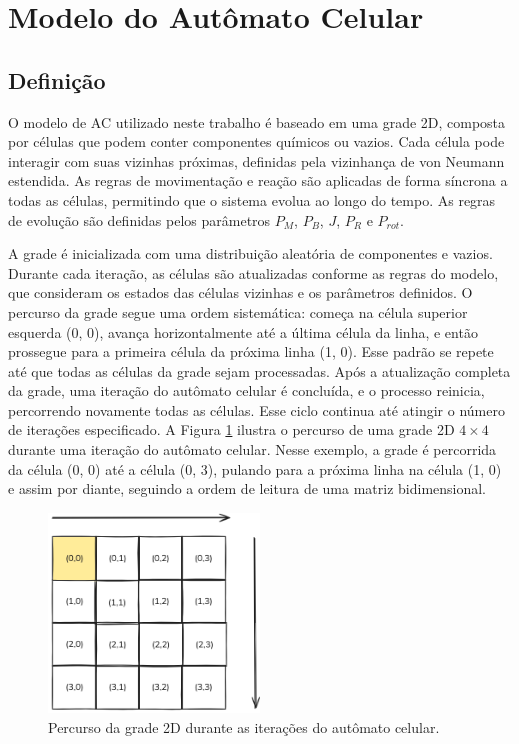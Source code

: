 \documentclass[12pt,oneside]{report}
\begin{document}
\section{Modelo do Autômato Celular}

\subsection{Definição}

O modelo de AC utilizado neste trabalho é baseado em uma grade 2D, composta por células que podem conter componentes químicos ou vazios. Cada célula pode interagir com suas vizinhas próximas, definidas pela vizinhança de von Neumann estendida. As regras de movimentação e reação são aplicadas de forma síncrona a todas as células, permitindo que o sistema evolua ao longo do tempo. As regras de evolução são definidas pelos parâmetros \hyperref[subsubsec:Pm]{$P_M$}, \hyperref[subsubsec:Pb]{$P_B$}, \hyperref[subsubsec:J]{$J$}, \hyperref[subsubsec:Pr]{$P_R$} e \hyperref[subsubsec:Prot]{$P_{rot}$}.

A grade é inicializada com uma distribuição aleatória de componentes e vazios. Durante cada iteração, as células são atualizadas conforme as regras do modelo, que consideram os estados das células vizinhas e os parâmetros definidos. O percurso da grade segue uma ordem sistemática: começa na célula superior esquerda (0, 0), avança horizontalmente até a última célula da linha, e então prossegue para a primeira célula da próxima linha (1, 0). Esse padrão se repete até que todas as células da grade sejam processadas. Após a atualização completa da grade, uma iteração do autômato celular é concluída, e o processo reinicia, percorrendo novamente todas as células. Esse ciclo continua até atingir o número de iterações especificado. A Figura \ref{fig:percorre_grade} ilustra o percurso de uma grade 2D $4 \times 4$ durante uma iteração do autômato celular. Nesse exemplo, a grade é percorrida da célula (0, 0) até a célula (0, 3), pulando para a próxima linha na célula (1, 0) e assim por diante, seguindo a ordem de leitura de uma matriz bidimensional.

\begin{figure}[H]
    \centering
    \includegraphics[width=0.5\textwidth]{img/percorre_grade.png}
    \caption{\small Percurso da grade 2D durante as iterações do autômato celular.}
    \label{fig:percorre_grade}
\end{figure}
\end{document}
